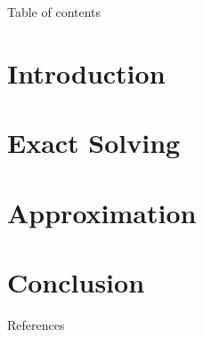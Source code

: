 \documentclass[compress,aspectratio=169]{beamer}
\begin{document}
\begin{frame}[plain]
	\titlepage
\end{frame}

\begin{frame}[t]{Table of contents}
  \tableofcontents[subsectionstyle=hide/hide]
\end{frame}


\section{Introduction}


\section{Exact Solving}


\section{Approximation}




\section{Conclusion}




\begin{frame}{References}
    \renewcommand*{\bibfont}{\normalfont\scriptsize}
    \printbibliography[heading=none]
\end{frame}
\end{document}
